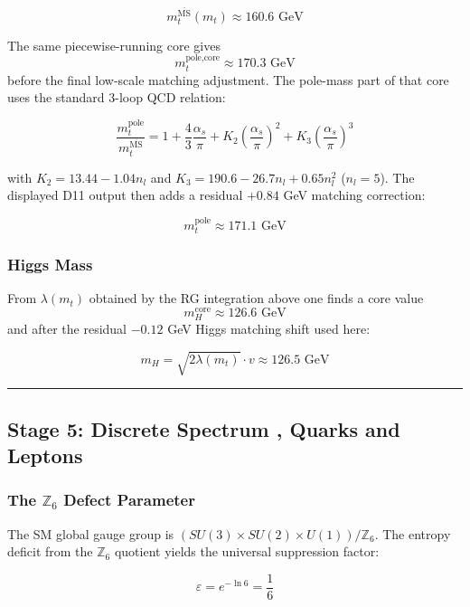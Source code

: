 \[m_t^{\overline{\text{MS}}}(m_t) \approx 160.6 \text{ GeV}\]

The same piecewise-running core gives
\[m_t^{\text{pole,core}} \approx 170.3 \text{ GeV}\]
before the final low-scale matching adjustment. The pole-mass part of that core uses the standard 3-loop QCD relation:

\[\frac{m_t^{\text{pole}}}{m_t^{\overline{\text{MS}}}} = 1 + \frac{4}{3}\frac{\alpha_s}{\pi} + K_2 \left(\frac{\alpha_s}{\pi}\right)^2 + K_3 \left(\frac{\alpha_s}{\pi}\right)^3\]

with \(K_2 = 13.44 - 1.04 n_l\) and \(K_3 = 190.6 - 26.7 n_l + 0.65 n_l^2\) (\(n_l = 5\)). The displayed D11 output then adds a residual \(+0.84\) GeV matching correction:

\[m_t^{\text{pole}} \approx 171.1 \text{ GeV}\]

\subsubsection{Higgs Mass}\label{54-higgs-mass}

From \(\lambda(m_t)\) obtained by the RG integration above one finds a core value
\[m_H^{\text{core}} \approx 126.6 \text{ GeV}\]
and after the residual \(-0.12\) GeV Higgs matching shift used here:

\[m_H = \sqrt{2\lambda(m_t)} \cdot v \approx 126.5 \text{ GeV}\]

\begin{center}\rule{0.5\linewidth}{0.5pt}\end{center}

\subsection{Stage 5: Discrete Spectrum , Quarks and Leptons}\label{6-stage-5-discrete-spectrum--quarks-and-leptons}

\subsubsection{\texorpdfstring{The \(\mathbb{Z}_6\) Defect Parameter}{6.1 The \textbackslash mathbb\{Z\}\_6 Defect Parameter}}\label{61-the-mathbbz_6-defect-parameter}

The SM global gauge group is \((SU(3) \times SU(2) \times U(1))/\mathbb{Z}_6\). The entropy deficit from the \(\mathbb{Z}_6\) quotient yields the universal suppression factor:

\[\varepsilon = e^{-\ln 6} = \frac{1}{6}\]

